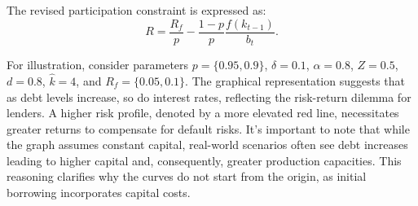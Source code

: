 \documentclass[12pt]{article}
\begin{document}
The revised participation constraint is expressed as:
\[
R=\frac{R_f}{p}  -\frac{ 1-p }{ p }\frac{f(k_{t-1})}{b_t}.
\]

For illustration, consider parameters \(p = \{0.95,0.9\}\), \(\delta = 0.1\), \(\alpha = 0.8\), \(Z = 0.5\), \(d =
0.8\), \(\widehat{k} = 4\), and \(R_f=\{0.05,0.1\}\). The graphical representation suggests that as debt levels
increase, so do interest rates, reflecting the risk-return dilemma for lenders. A higher risk profile, denoted by a more
elevated red line, necessitates greater returns to compensate for default risks. It's important to note that while the
graph assumes constant capital, real-world scenarios often see debt increases leading to higher capital and,
consequently, greater production capacities. This reasoning clarifies why  the curves do not start from the origin, as
initial borrowing incorporates capital costs.
\end{document}
